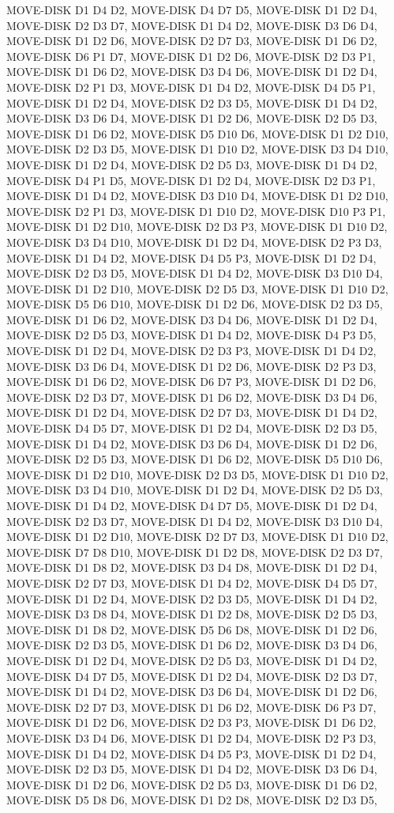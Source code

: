 \documentclass[12pt]{article}
\begin{document}
\begin{appendix}
\begin{itemize}
MOVE-DISK D1 D4 D2,  MOVE-DISK D4 D7 D5,  MOVE-DISK D1 D2 D4,  MOVE-DISK D2 D3 D7,  MOVE-DISK D1 D4 D2,  MOVE-DISK D3 D6 D4,  MOVE-DISK D1 D2 D6,  MOVE-DISK D2 D7 D3,  MOVE-DISK D1 D6 D2,  MOVE-DISK D6 P1 D7,  MOVE-DISK D1 D2 D6,  MOVE-DISK D2 D3 P1,  MOVE-DISK D1 D6 D2,  MOVE-DISK D3 D4 D6,  MOVE-DISK D1 D2 D4,  MOVE-DISK D2 P1 D3,  MOVE-DISK D1 D4 D2,  MOVE-DISK D4 D5 P1,  MOVE-DISK D1 D2 D4,  MOVE-DISK D2 D3 D5,  MOVE-DISK D1 D4 D2,  MOVE-DISK D3 D6 D4,  MOVE-DISK D1 D2 D6,  MOVE-DISK D2 D5 D3,  MOVE-DISK D1 D6 D2,  MOVE-DISK D5 D10 D6,  MOVE-DISK D1 D2 D10,  MOVE-DISK D2 D3 D5,  MOVE-DISK D1 D10 D2,  MOVE-DISK D3 D4 D10,  MOVE-DISK D1 D2 D4,  MOVE-DISK D2 D5 D3,  MOVE-DISK D1 D4 D2,  MOVE-DISK D4 P1 D5,  MOVE-DISK D1 D2 D4,  MOVE-DISK D2 D3 P1,  MOVE-DISK D1 D4 D2,  MOVE-DISK D3 D10 D4,  MOVE-DISK D1 D2 D10,  MOVE-DISK D2 P1 D3,  MOVE-DISK D1 D10 D2,  MOVE-DISK D10 P3 P1,  MOVE-DISK D1 D2 D10,  MOVE-DISK D2 D3 P3,  MOVE-DISK D1 D10 D2,  MOVE-DISK D3 D4 D10,  MOVE-DISK D1 D2 D4,  MOVE-DISK D2 P3 D3,  MOVE-DISK D1 D4 D2,  MOVE-DISK D4 D5 P3,  MOVE-DISK D1 D2 D4,  MOVE-DISK D2 D3 D5,  MOVE-DISK D1 D4 D2,  MOVE-DISK D3 D10 D4,  MOVE-DISK D1 D2 D10,  MOVE-DISK D2 D5 D3,  MOVE-DISK D1 D10 D2,  MOVE-DISK D5 D6 D10,  MOVE-DISK D1 D2 D6,  MOVE-DISK D2 D3 D5,  MOVE-DISK D1 D6 D2,  MOVE-DISK D3 D4 D6,  MOVE-DISK D1 D2 D4,  MOVE-DISK D2 D5 D3,  MOVE-DISK D1 D4 D2,  MOVE-DISK D4 P3 D5,  MOVE-DISK D1 D2 D4,  MOVE-DISK D2 D3 P3,  MOVE-DISK D1 D4 D2,  MOVE-DISK D3 D6 D4,  MOVE-DISK D1 D2 D6,  MOVE-DISK D2 P3 D3,  MOVE-DISK D1 D6 D2,  MOVE-DISK D6 D7 P3,  MOVE-DISK D1 D2 D6,  MOVE-DISK D2 D3 D7,  MOVE-DISK D1 D6 D2,  MOVE-DISK D3 D4 D6,  MOVE-DISK D1 D2 D4,  MOVE-DISK D2 D7 D3,  MOVE-DISK D1 D4 D2,  MOVE-DISK D4 D5 D7,  MOVE-DISK D1 D2 D4,  MOVE-DISK D2 D3 D5,  MOVE-DISK D1 D4 D2,  MOVE-DISK D3 D6 D4,  MOVE-DISK D1 D2 D6,  MOVE-DISK D2 D5 D3,  MOVE-DISK D1 D6 D2,  MOVE-DISK D5 D10 D6,  MOVE-DISK D1 D2 D10,  MOVE-DISK D2 D3 D5,  MOVE-DISK D1 D10 D2,  MOVE-DISK D3 D4 D10,  MOVE-DISK D1 D2 D4,  MOVE-DISK D2 D5 D3,  MOVE-DISK D1 D4 D2,  MOVE-DISK D4 D7 D5,  MOVE-DISK D1 D2 D4,  MOVE-DISK D2 D3 D7,  MOVE-DISK D1 D4 D2,  MOVE-DISK D3 D10 D4,  MOVE-DISK D1 D2 D10,  MOVE-DISK D2 D7 D3,  MOVE-DISK D1 D10 D2,  MOVE-DISK D7 D8 D10,  MOVE-DISK D1 D2 D8,  MOVE-DISK D2 D3 D7,  MOVE-DISK D1 D8 D2,  MOVE-DISK D3 D4 D8,  MOVE-DISK D1 D2 D4,  MOVE-DISK D2 D7 D3,  MOVE-DISK D1 D4 D2,  MOVE-DISK D4 D5 D7,  MOVE-DISK D1 D2 D4,  MOVE-DISK D2 D3 D5,  MOVE-DISK D1 D4 D2,  MOVE-DISK D3 D8 D4,  MOVE-DISK D1 D2 D8,  MOVE-DISK D2 D5 D3,  MOVE-DISK D1 D8 D2,  MOVE-DISK D5 D6 D8,  MOVE-DISK D1 D2 D6,  MOVE-DISK D2 D3 D5,  MOVE-DISK D1 D6 D2,  MOVE-DISK D3 D4 D6,  MOVE-DISK D1 D2 D4,  MOVE-DISK D2 D5 D3,  MOVE-DISK D1 D4 D2,  MOVE-DISK D4 D7 D5,  MOVE-DISK D1 D2 D4,  MOVE-DISK D2 D3 D7,  MOVE-DISK D1 D4 D2,  MOVE-DISK D3 D6 D4,  MOVE-DISK D1 D2 D6,  MOVE-DISK D2 D7 D3,  MOVE-DISK D1 D6 D2,  MOVE-DISK D6 P3 D7,  MOVE-DISK D1 D2 D6,  MOVE-DISK D2 D3 P3,  MOVE-DISK D1 D6 D2,  MOVE-DISK D3 D4 D6,  MOVE-DISK D1 D2 D4,  MOVE-DISK D2 P3 D3,  MOVE-DISK D1 D4 D2,  MOVE-DISK D4 D5 P3,  MOVE-DISK D1 D2 D4,  MOVE-DISK D2 D3 D5,  MOVE-DISK D1 D4 D2,  MOVE-DISK D3 D6 D4,  MOVE-DISK D1 D2 D6,  MOVE-DISK D2 D5 D3,  MOVE-DISK D1 D6 D2,  MOVE-DISK D5 D8 D6,  MOVE-DISK D1 D2 D8,  MOVE-DISK D2 D3 D5,  
\end{itemize}
\end{appendix}
\end{document}
